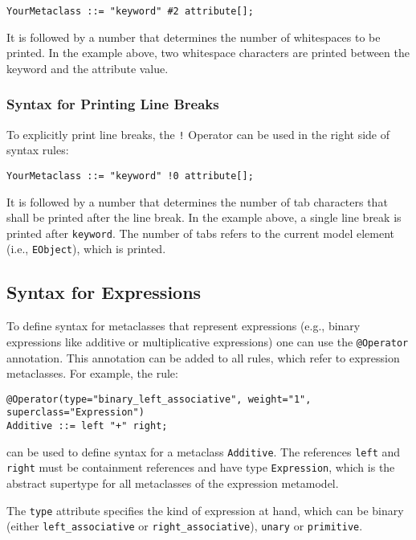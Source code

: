 \begin{lstlisting}
YourMetaclass ::= "keyword" #2 attribute[];
\end{lstlisting}

It is followed by a number that determines the number of whitespaces to be
printed. In the example above, two whitespace characters are printed between the
keyword and the attribute value.

\subsubsection{Syntax for Printing Line Breaks}

To explicitly print line breaks, the \texttt{!} Operator can be used in the
right side of syntax rules:

\begin{lstlisting}
YourMetaclass ::= "keyword" !0 attribute[];
\end{lstlisting}

It is followed by a number that determines the number of tab characters that
shall be printed after the line break. In the example above, a single line break
is printed after \texttt{keyword}. The number of tabs refers to the current
model element (i.e., \texttt{EObject}), which is printed.

\subsection{Syntax for Expressions}

To define syntax for metaclasses that represent expressions (e.g., binary
expressions like additive or multiplicative expressions) one can use the
\texttt{@Operator} annotation. This annotation can be added to all rules, which
refer to expression metaclasses. For example, the rule:

\begin{lstlisting}
@Operator(type="binary_left_associative", weight="1", superclass="Expression")
Additive ::= left "+" right;
\end{lstlisting}

can be used to define syntax for a metaclass \texttt{Additive}. The references
\texttt{left} and \texttt{right} must be containment references and have type
\texttt{Expression}, which is the abstract supertype for all metaclasses of the 
expression metamodel.

The \texttt{type} attribute specifies the kind of expression at hand, which can
be binary (either \texttt{left\_associative} or \texttt{right\_associative}),
\texttt{unary} or \texttt{primitive}.

